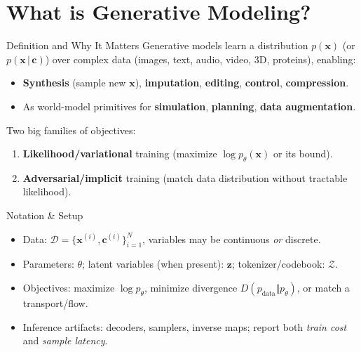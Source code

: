 \documentclass[aspectratio=169]{beamer}
\begin{document}
\section{What is Generative Modeling?}

\begin{frame}{Definition and Why It Matters}
Generative models learn a distribution $p(\mathbf{x})$ (or $p(\mathbf{x}\,|\,\mathbf{c})$) over complex data (images, text, audio, video, 3D, proteins), enabling:
\begin{itemize}
  \item \textbf{Synthesis} (sample new $\mathbf{x}$), \textbf{imputation}, \textbf{editing}, \textbf{control}, \textbf{compression}.
  \item As world-model primitives for \textbf{simulation}, \textbf{planning}, \textbf{data augmentation}.
\end{itemize}
\vspace{0.5em}
Two big families of objectives:
\begin{enumerate}
  \item \textbf{Likelihood/variational} training (maximize $\log p_\theta(\mathbf{x})$ or its bound).
  \item \textbf{Adversarial/implicit} training (match data distribution without tractable likelihood).
\end{enumerate}
\end{frame}

\begin{frame}{Notation \& Setup}
\small
\begin{itemize}
  \item Data: $\mathcal{D}=\{\mathbf{x}^{(i)},\mathbf{c}^{(i)}\}_{i=1}^N$, variables may be continuous \emph{or} discrete.
  \item Parameters: $\theta$; latent variables (when present): $\mathbf{z}$; tokenizer/codebook: $\mathcal{Z}$.
  \item Objectives: maximize $\log p_\theta$, minimize divergence $D( p_{\text{data}} \Vert p_\theta )$, or match a transport/flow.
  \item Inference artifacts: decoders, samplers, inverse maps; report both \textit{train cost} and \textit{sample latency}.
\end{itemize}
\end{frame}
\end{document}
